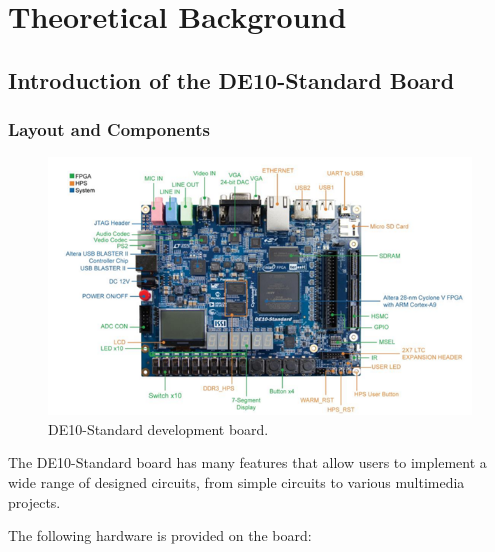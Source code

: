 \section{Theoretical Background}

\subsection{Introduction of the DE10-Standard Board}

\subsubsection{Layout and Components}

\begin{figure}[H]
	\centering
	\includegraphics[width=.7\linewidth]{./my-chapters/my-images/theoretical_background/DE_10_board.png}
	\caption{DE10-Standard development board.}
	\label{fig: DE10-Standard development board}
\end{figure}

The DE10-Standard board has many features that allow users to implement a wide range of designed circuits, from simple circuits to various multimedia projects.

The following hardware is provided on the board:

